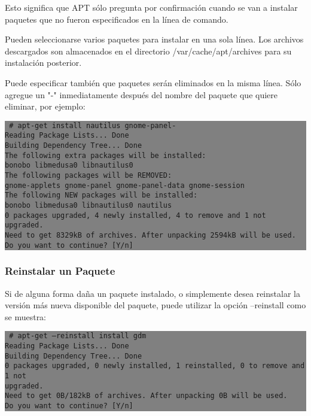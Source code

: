 \documentclass[12pt]{article}
\begin{document}
Esto significa que APT sólo pregunta por confirmación cuando se van a instalar paquetes que no fueron especificados en la línea de comando.

Pueden seleccionarse varios paquetes para instalar en una sola línea. Los archivos descargados son almacenados en el directorio /var/cache/apt/archives para su instalación posterior.

Puede especificar también que paquetes serán eliminados en la misma línea. Sólo agregue un "-" inmediatamente después del nombre del paquete que quiere eliminar, por ejemplo:

\colorbox{grey}{\parbox[t]{0.95\linewidth}{ \vspace*{0.5cm} {\tt
     \# apt-get install nautilus gnome-panel-\\
     Reading Package Lists... Done\\
     Building Dependency Tree... Done\\
     The following extra packages will be installed:\\
       bonobo libmedusa0 libnautilus0\\
     The following packages will be REMOVED:\\
       gnome-applets gnome-panel gnome-panel-data gnome-session\\
     The following NEW packages will be installed:\\
       bonobo libmedusa0 libnautilus0 nautilus\\
     0 packages upgraded, 4 newly installed, 4 to remove and 1 not upgraded.\\
     Need to get 8329kB of archives. After unpacking 2594kB will be used.\\
     Do you want to continue? [Y/n]\\
 } \vspace*{0.5cm} } } 

\subsubsection*{Reinstalar un Paquete}

Si de alguna forma daña un paquete instalado, o simplemente desea reinstalar la versión más nueva disponible del paquete, puede utilizar la opción --reinstall como se muestra:

\colorbox{grey}{\parbox[t]{0.95\linewidth}{ \vspace*{0.5cm} {\tt
     \# apt-get --reinstall install gdm\\
     Reading Package Lists... Done\\
     Building Dependency Tree... Done\\
     0 packages upgraded, 0 newly installed, 1 reinstalled, 0 to remove and 1 not\\
      upgraded.\\
     Need to get 0B/182kB of archives. After unpacking 0B will be used.\\
     Do you want to continue? [Y/n]\\
 } \vspace*{0.5cm} } } 
\end{document}
